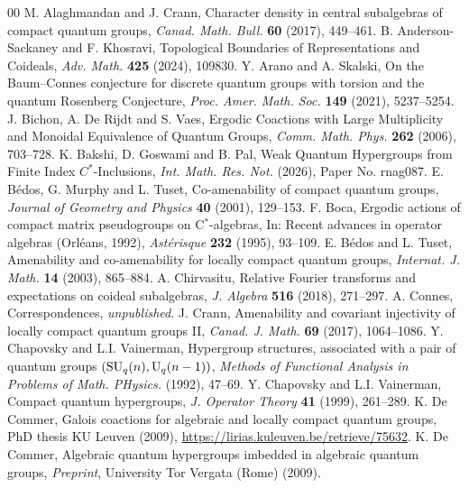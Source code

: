 \documentclass[reqno]{amsart}
\numberwithin{equation}{section}
\begin{document}
\begin{thebibliography}{00}
 M. Alaghmandan and J. Crann, Character density in central subalgebras of compact quantum groups, \emph{Canad. Math. Bull.} \textbf{60} (2017), 449--461.
 B. Anderson-Sackaney and F. Khosravi, Topological Boundaries of Representations and Coideals, \emph{Adv. Math.} \textbf{425} (2024), 109830.
 Y. Arano and A. Skalski, On the Baum--Connes conjecture for discrete quantum groups with torsion and the quantum Rosenberg Conjecture, \emph{Proc. Amer. Math. Soc.} \textbf{149} (2021), 5237--5254.
 J. Bichon, A. De Rijdt and S. Vaes,  Ergodic Coactions with Large Multiplicity and Monoidal Equivalence of Quantum Groups, \emph{Comm. Math. Phys.} \textbf{262} (2006), 703--728.
 K. Bakshi, D. Goswami and B. Pal, Weak {Q}uantum {H}ypergroups from {F}inite {I}ndex {$C^*$}-{I}nclusions, \emph{Int. Math. Res. Not.} (2026), Paper No. rnag087.
 E. Bédos, G. Murphy and L. Tuset, Co-amenability of compact quantum groups, \emph{Journal of Geometry and Physics} \textbf{40}  (2001), 129--153.
 F. Boca, Ergodic actions of compact matrix pseudogroups on C$^*$-algebras, In: Recent advances in operator algebras (Orléans, 1992), \emph{Astérisque} \textbf{232} (1995), 93--109.
 E. Bédos and L. Tuset, Amenability and co-amenability for locally compact quantum groups, \emph{Internat. J. Math.} \textbf{14} (2003), 865--884.
 A. Chirvasitu, Relative Fourier transforms and expectations on coideal subalgebras, \emph{J. Algebra} \textbf{516} (2018), 271--297.
 A. Connes, Correspondences, \emph{unpublished}.
 J. Crann, Amenability and covariant injectivity of locally compact quantum groups {II}, \emph{Canad. J. Math.} \textbf{69} (2017), 1064--1086.
 Y. Chapovsky and L.I. Vainerman, Hypergroup structures, associated with a pair of quantum groups {$({\rm SU}_q(n),{\rm U}_q(n-1))$}, \emph{Methods of Functional
Analysis in Problems of Math. PHysics.} (1992), 47--69.
 Y. Chapovsky and L.I. Vainerman, Compact quantum hypergroups, \emph{J. Operator Theory} \textbf{41} (1999), 261--289.
 K. De Commer, Galois coactions for algebraic and locally compact quantum groups, PhD thesis KU Leuven (2009), \url{https://lirias.kuleuven.be/retrieve/75632}.
 K. De Commer, Algebraic quantum hypergroups imbedded in algebraic quantum groups, \emph{Preprint}, University Tor Vergata (Rome) (2009). 

\end{thebibliography}
\end{document}
